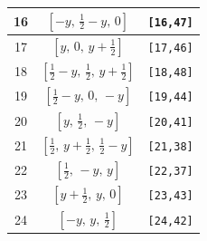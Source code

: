 \documentclass[fleqn,8pt]{jsarticle}
\begin{document}
\begin{longtable}{ccc}
16 & $\left[ - y,\, \frac{1}{2} - y,\, 0 \right]$ & {\tt [16,47]} \\ \hline
17 & $\left[ y,\, 0,\, y + \frac{1}{2} \right]$ & {\tt [17,46]} \\ \hline
18 & $\left[ \frac{1}{2} - y,\, \frac{1}{2},\, y + \frac{1}{2} \right]$ & {\tt [18,48]} \\ \hline
19 & $\left[ \frac{1}{2} - y,\, 0,\, - y \right]$ & {\tt [19,44]} \\ \hline
20 & $\left[ y,\, \frac{1}{2},\, - y \right]$ & {\tt [20,41]} \\ \hline
21 & $\left[ \frac{1}{2},\, y + \frac{1}{2},\, \frac{1}{2} - y \right]$ & {\tt [21,38]} \\ \hline
22 & $\left[ \frac{1}{2},\, - y,\, y \right]$ & {\tt [22,37]} \\ \hline
23 & $\left[ y + \frac{1}{2},\, y,\, 0 \right]$ & {\tt [23,43]} \\ \hline
24 & $\left[ - y,\, y,\, \frac{1}{2} \right]$ & {\tt [24,42]} \\
\end{longtable}
\renewcommand{\arraystretch}{1.2}
\end{document}
